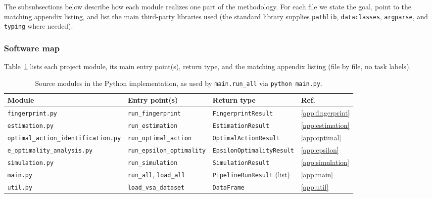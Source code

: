 \documentclass[11pt,a4paper]{article}
\begin{document}
The subsubsections below describe how each module realizes one part of the
methodology. For each file we state the goal, point to the matching appendix
listing, and list the main third-party libraries used (the standard library
supplies \texttt{pathlib}, \texttt{dataclasses}, \texttt{argparse}, and
\texttt{typing} where needed).

\subsubsection{Software map}\label{sec:software-map}

Table~\ref{tab:software-map} lists each project module, its main entry point(s),
return type, and the matching appendix listing (file by file, no task labels).

\begin{table}[H]
  \centering
  \caption{Source modules in the Python implementation, as used by
    \texttt{main.run\_all} via \texttt{python main.py}.}
  \label{tab:software-map}
  \footnotesize
  \setlength{\tabcolsep}{5pt}
  \begin{tabularx}{\linewidth}{@{}>{\raggedright\arraybackslash}p{4.75cm}
    >{\raggedright\arraybackslash}X
    >{\raggedright\arraybackslash}p{2.35cm}
    >{\centering\arraybackslash}p{0.75cm}@{}}
    \toprule
    \textbf{Module} & \textbf{Entry point(s)} & \textbf{Return type} & \textbf{Ref.} \\
    \midrule
    \texttt{fingerprint.py}
      & \texttt{run\_fingerprint}
      & \texttt{Fingerprint\-Result}
      & \ref{app:fingerprint} \\
    \texttt{estimation.py}
      & \texttt{run\_estimation}
      & \texttt{Estimation\-Result}
      & \ref{app:estimation} \\
    \texttt{optimal\_action\_}\allowbreak\texttt{identification.py}
      & \texttt{run\_optimal\_action}
      & \texttt{Optimal\-Action\-Result}
      & \ref{app:optimal} \\
    \texttt{e\_optimality\_analysis.py}
      & \texttt{run\_epsilon\_optimality}
      & \texttt{Epsilon\-Optimality\-Result}
      & \ref{app:epsilon} \\
    \texttt{simulation.py}
      & \texttt{run\_simulation}
      & \texttt{Simulation\-Result}
      & \ref{app:simulation} \\
    \texttt{main.py}
      & \texttt{run\_all}, \texttt{load\_all}
      & \texttt{Pipeline\-Run\-Result} (list)
      & \ref{app:main} \\
    \texttt{util.py}
      & \texttt{load\_vsa\_dataset}
      & \texttt{DataFrame}
      & \ref{app:util} \\
    \bottomrule
  \end{tabularx}
\end{table}
\end{document}
